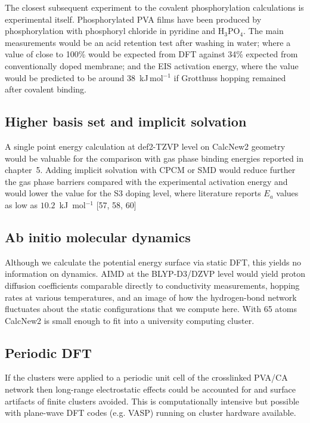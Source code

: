 \documentclass[12pt,a4paper]{report}
\begin{document}
The closest subsequent experiment to the covalent phosphorylation calculations is experimental itself. Phosphorylated PVA films have been produced by phosphorylation with phosphoryl chloride in pyridine and H\(_3\)PO\(_4\). The main measurements would be an acid retention test after washing in water; where a value of close to 100\% would be expected from DFT against 34\% expected from conventionally doped membrane; and the EIS activation energy, where the value would be predicted to be around 38~kJ\,mol\(^{-1}\) if Grotthuss hopping remained after covalent binding.

\subsection*{Higher basis set and implicit solvation}

A single point energy calculation at def2-TZVP level on CalcNew2 geometry would be valuable for the comparison with gas phase binding energies reported in chapter~5. Adding implicit solvation with CPCM or SMD would reduce further the gas phase barriers compared with the experimental activation energy and would lower the value for the S3 doping level, where literature reports $E_a$ values as low as $10.2$~kJ~mol$^{-1}$ [57, 58, 60]
\subsection*{Ab initio molecular dynamics}

Although we calculate the potential energy surface via static DFT, this yields no information on dynamics. AIMD at the BLYP-D3/DZVP level would yield proton diffusion coefficients comparable directly to conductivity measurements, hopping rates at various temperatures, and an image of how the hydrogen-bond network fluctuates about the static configurations that we compute here. With 65 atoms CalcNew2 is small enough to fit into a university computing cluster.

\subsection*{Periodic DFT}

If the clusters were applied to a periodic unit cell of the crosslinked PVA/CA network then long-range electrostatic effects could be accounted for and surface artifacts of finite clusters avoided. This is computationally intensive but possible with plane-wave DFT codes (e.g. VASP) running on cluster hardware available.
\end{document}
